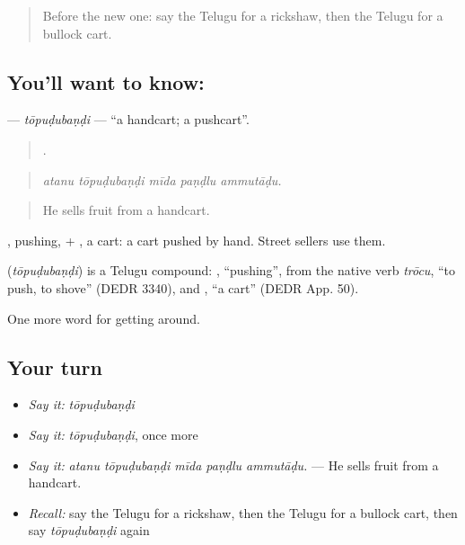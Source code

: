 \label{lesson:TE-C451-topudubandi}



\begin{quote}
Before the new one: say the Telugu for a rickshaw, then the Telugu for a bullock cart.
\end{quote}

\subsection*{You'll want to know: }
\textbf{} — \emph{tōpuḍubaṇḍi} — \textquotedblleft{}a handcart; a pushcart\textquotedblright{}.

\begin{quote}
    .
\end{quote}

\begin{quote}
\emph{atanu tōpuḍubaṇḍi mīda paṇḍlu ammutāḍu.}
\end{quote}

\begin{quote}
He sells fruit from a handcart.
\end{quote}

, pushing, + , a cart: a cart pushed by hand. Street sellers use them.

\begin{cousinweb}
\textbf{} (\emph{tōpuḍubaṇḍi}) is a Telugu compound: , \textquotedblleft{}pushing\textquotedblright{}, from the native verb \emph{trōcu}, \textquotedblleft{}to push, to shove\textquotedblright{} (DEDR 3340), and , \textquotedblleft{}a cart\textquotedblright{} (DEDR App. 50).
\end{cousinweb}

\begin{grammarlens}[title={What you've built}]
One more word for getting around.
\end{grammarlens}

\subsection*{Your turn}
\begin{itemize}
\raggedright
  \item \emph{Say it:} \emph{tōpuḍubaṇḍi}
  \item \emph{Say it:} \emph{tōpuḍubaṇḍi}, once more
  \item \emph{Say it:} \emph{atanu tōpuḍubaṇḍi mīda paṇḍlu ammutāḍu.} — He sells fruit from a handcart.
  \item \emph{Recall:} say the Telugu for a rickshaw, then the Telugu for a bullock cart, then say \emph{tōpuḍubaṇḍi} again
\end{itemize}

